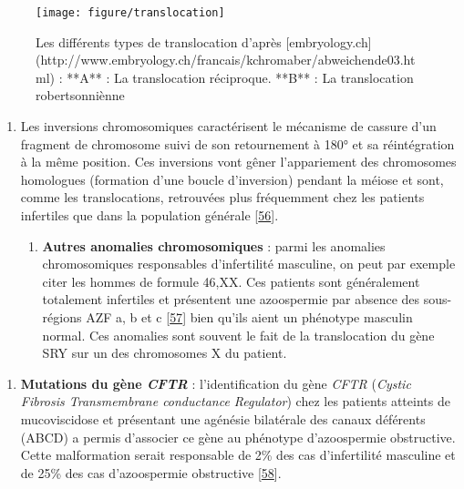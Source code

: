 \documentclass[12pt,twoside]{ugathesis}
\providecommand{\tightlist}{%
  \setlength{\itemsep}{0pt}\setlength{\parskip}{0pt}}
\theoremstyle{definition}
\theoremstyle{definition}
\theoremstyle{remark}
\begin{document}
\begin{figure}

{\centering \texttt{[image: figure/translocation]} 

}

\caption[Les différents types de translocation]{Les différents types de translocation d'après [embryology.ch](http://www.embryology.ch/francais/kchromaber/abweichende03.html) :  **A** : La translocation réciproque. **B** : La translocation robertsonniènne}\label{fig:figtranslocation}
\end{figure}

\begin{enumerate}
\def\labelenumi{\roman{enumi}.}
\setcounter{enumi}{1}
\item
  Les inversions chromosomiques caractérisent le mécanisme de cassure
  d'un fragment de chromosome suivi de son retournement à 180° et sa
  réintégration à la même position. Ces inversions vont gêner
  l'appariement des chromosomes homologues (formation d'une boucle
  d'inversion) pendant la méiose et sont, comme les translocations,
  retrouvées plus fréquemment chez les patients infertiles que dans la
  population générale {[}\protect\hyperlink{ref-Krausz2000}{56}{]}.

  \begin{enumerate}
  \def\labelenumii{\alph{enumii}.}
  \setcounter{enumii}{2}
  \tightlist
  \item
    \textbf{Autres anomalies chromosomiques} : parmi les anomalies
    chromosomiques responsables d'infertilité masculine, on peut par
    exemple citer les hommes de formule 46,XX. Ces patients sont
    généralement totalement infertiles et présentent une azoospermie par
    absence des sous- régions AZF a, b et c
    {[}\protect\hyperlink{ref-Vorona2007}{57}{]} bien qu'ils aient un
    phénotype masculin normal. Ces anomalies sont souvent le fait de la
    translocation du gène SRY sur un des chromosomes X du patient.
  \end{enumerate}
\end{enumerate}

\begin{enumerate}
\def\labelenumi{\arabic{enumi}.}
\setcounter{enumi}{2}
\tightlist
\item
  \textbf{Mutations du gène \emph{CFTR} }: l'identification du gène
  \emph{CFTR} (\emph{Cystic Fibrosis Transmembrane conductance
  Regulator}) chez les patients atteints de mucoviscidose et présentant
  une agénésie bilatérale des canaux déférents (ABCD) a permis
  d'associer ce gène au phénotype d'azoospermie obstructive. Cette
  malformation serait responsable de 2\% des cas d'infertilité masculine
  et de 25\% des cas d'azoospermie obstructive
  {[}\protect\hyperlink{ref-Yu2012}{58}{]}.
\end{enumerate}
\end{document}
